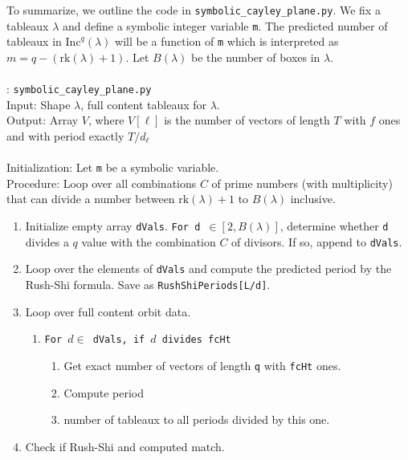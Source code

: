 \documentclass[12pt]{amsart}
\theoremstyle{definition}
\theoremstyle{remark}
\numberwithin{equation}{section}
\newcommand{\inc}{\ensuremath{\mathrm{Inc}}}
\begin{document}
To summarize, we outline the code in \texttt{symbolic_cayley_plane.py}. We fix a tableaux $\lambda$ and define a symbolic integer variable \texttt{m}. The predicted number of tableaux in $\inc^q(\lambda)$ will be a function of \texttt{m} which is interpreted as $m = q-(\text{rk}(\lambda)+1)$. Let $B(\lambda)$ be the number of boxes in $\lambda$. 
\-\ \\ \-\ \\ 
: \texttt{symbolic_cayley_plane.py} \\ \noindent
\textsf{Input}: Shape $\lambda$, full content tableaux for $\lambda$.  \\ \noindent
\textsf{Output}: Array $V$, where $V[\ell]$ is the number of vectors of length $T$ with $f$ ones and with period exactly $T/d_{\ell}$ \\ \-\ \\
\textsf{Initialization}: Let \texttt{m} be a symbolic variable. \\ 
\textsf{Procedure}: 
Loop over all combinations  $C$ of prime numbers (with multiplicity) that can divide a number between $\text{rk}(\lambda)+1$ to $B(\lambda)$ inclusive.
\begin{enumerate} 
\item Initialize empty array \texttt{dVals}. \texttt{For d $ \in [2,B(\lambda)]$}, determine whether \texttt{d} divides a $q$ value with the combination $C$ of divisors. If so, append to \texttt{dVals}.  
\item Loop over the elements of \texttt{dVals} and compute the predicted period by the Rush-Shi formula. Save as \texttt{RushShiPeriods[L/d]}.
\item Loop over full content orbit data. 
\begin{enumerate}
\item \texttt{For $d \in $ dVals, if $d$ divides fcHt}
\begin{enumerate}
\item Get exact number of vectors of length \texttt{q} with \texttt{fcHt} ones.
\item Compute period
\item number of tableaux to all periods divided by this one.
\end{enumerate}
\end{enumerate}
\item Check if Rush-Shi and computed match.
\end{enumerate}
\end{document}
